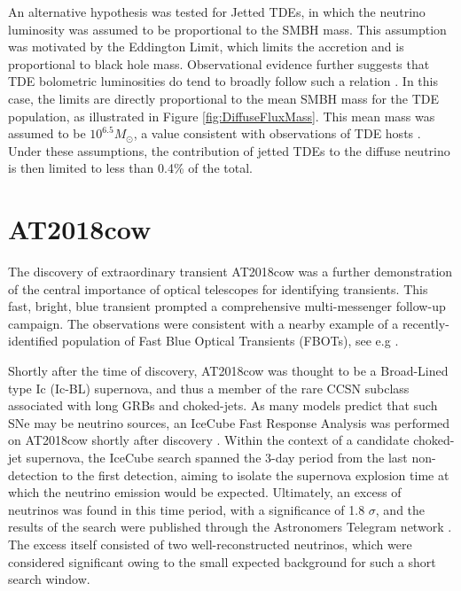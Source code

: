\documentclass{PoS}
\begin{document}
An alternative hypothesis was tested for Jetted TDEs, in which the neutrino luminosity was assumed to be proportional to the SMBH mass. This assumption was motivated by the Eddington Limit, which limits the accretion and is proportional to black hole mass. Observational evidence further suggests that TDE bolometric luminosities do tend to broadly follow such a relation \cite{wevers}. In this case, the limits are directly proportional to the mean SMBH mass for the TDE population, as illustrated in Figure \ref{fig:DiffuseFluxMass}. This mean mass was assumed to be $10^{6.5} M_{\odot}$, a value consistent with observations of TDE hosts \cite{wevers}. Under these assumptions, the contribution of jetted TDEs to the diffuse neutrino is then limited to less than 0.4\% of the total. 

\section{AT2018cow}

The discovery of extraordinary transient AT2018cow was a further demonstration of the central importance of optical telescopes for identifying transients.  This fast, bright, blue transient prompted a comprehensive multi-messenger follow-up campaign. The observations were consistent with a nearby example of a recently-identified population of Fast Blue Optical Transients (FBOTs), see e.g \cite{Margutti:2018rri}. 

Shortly after the time of discovery, AT2018cow was thought to be a Broad-Lined type Ic (Ic-BL) supernova, and thus a member of the rare CCSN subclass associated with long GRBs and choked-jets. As many models predict that such SNe may be neutrino sources, an IceCube Fast Response Analysis was performed on AT2018cow shortly after discovery \cite{icrc_19_fra}. Within the context of a candidate choked-jet supernova, the IceCube search spanned the 3-day period from the last non-detection to the first detection, aiming to isolate the supernova explosion time at which the neutrino emission would be expected. Ultimately, an excess of neutrinos was found in this time period, with a significance of 1.8 $\sigma$, and the results of the search were published through the Astronomers Telegram network \cite{2018ATel11785....1B}. The excess itself consisted of two well-reconstructed neutrinos, which were considered significant owing to the small expected background for such a short search window.
\end{document}
